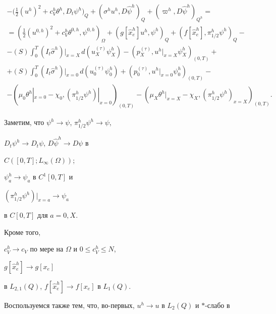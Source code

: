 \documentclass[12pt]{article}
\theoremstyle{plain} %
\theoremstyle{definition}
\numberwithin{equation}{section}
\begin{document}
\begin{pf}
\begin{gather*}


-\bigl(\frac{1}{2}(u^h)^2 + c_V^h\theta^h, D_t\psi^h\bigr)_Q +


(\sigma^h u^h,D\widehat\psi^h)_Q


+(\varpi^h,D\widehat\psi^h)_{Q^h}=\\


%


=(\frac{1}{2}(u^{0,h})^2 + c_V^h\theta^{0,h}, \psi^{0,h})_\Omega


+ (g[\widehat x_e^h] u^h, \psi^h)_Q


+ (f[\widehat x_e^h],\pi^h_{1/2}\psi^h)_Q -\\


%


-(S)\int_0^T(I_t\widehat\sigma^h)|_{x=X}\,d(u_X^{(\tau)}\psi^h_{X}) -


(p^{(\tau)}_X,u^h|_{x=X}\psi^h_X)_{(0,T)}+\\


%


+(S)\int_0^T(I_t\widehat\sigma^h)|_{x=0}\,d(u_0^{(\tau)}\psi^h_0) +


(p^{(\tau)}_0,u^h|_{x=0}\psi^h_0)_{(0,T)}-\\


%


-(\mu_0\theta^h|_{x=0} -\chi_0,(\pi^h_{1/2}\psi^h)|_{x=0})_{(0,T)}


-(\mu_X\theta^h|_{x=X} -\chi_X,(\pi^h_{1/2}\psi^h)_{x=X})_{(0,T)}.


\end{gather*}


Заметим, что $\psi^h\to\psi$, $\pi^h_{1/2}\psi^h\to\psi$,


$D_t\psi^h\to D_t\psi$, $D\widehat\psi^h\to D\psi$ в


$C([0,T]; L_\infty(\Omega))$;


$\psi^h_a\to\psi_a$ в $C^1[0,T]$ и


$(\pi^h_{1/2}\psi^h)\bigr|_{x=a}\to\psi_a$


в $C[0,T]$ для $a=0,X$.


Кроме того,


$c_V^h\to c_V$ по мере на $\Omega$ и $0\le c_V^h\le N$,


$g[\widehat x^h_e]\to g[x_e]$


в $L_{2,1}(Q)$, $f[\widehat x^h_e]\to f[x_e]$ в $L_1(Q)$.


Воспользуемся также тем, что, во-первых, $u^h\to u$ в $L_2(Q)$ и $\ast$-слабо в



\end{pf}
\end{document}
